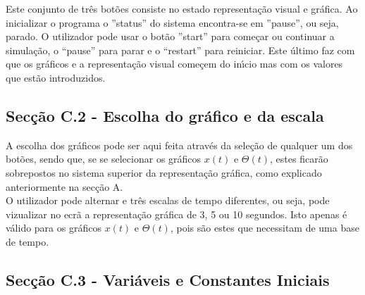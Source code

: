 \documentclass[12pt]{article}
\begin{document}
{
Este conjunto de tr\^es bot\~oes consiste no estado representa\c{c}\~ao visual e gr\'afica. Ao inicializar o programa o ''status'' do sistema encontra-se em ''pause'', ou seja, parado. O utilizador pode usar o bot\~ao ''start'' para come\c{c}ar ou continuar a simula\c{c}\~ao, o “pause” para parar e o “restart” para reiniciar. Este \'ultimo faz com que os gr\'aficos e a representa\c{c}\~ao visual come\c{c}em do in\'{\i}cio mas com os valores que est\~ao introduzidos. 
}

\subsection{Sec\c{c}\~ao C.2 - Escolha do gr\'afico e da escala}

{
A escolha dos gr\'aficos pode ser aqui feita atrav\'es da sele\c{c}\~ao de qualquer um dos bot\~oes, sendo que, se se selecionar os gr\'aficos $x(t)$ e $\Theta(t)$, estes ficar\~ao sobrepostos no sistema superior da representa\c{c}\~ao gr\'afica, como explicado anteriormente na sec\c{c}\~ao A.
\\
O utilizador pode alternar e tr\^es escalas de tempo diferentes, ou seja, pode vizualizar no ecr\~a a representa\c{c}\~ao gr\'afica de 3, 5 ou 10 segundos. Isto apenas \'e v\'alido para os gr\'aficos $x(t)$ e $\Theta(t)$, pois s\~ao estes que necessitam de uma base de tempo.
}

\subsection{Sec\c{c}\~ao C.3 - Vari\'aveis e Constantes Iniciais}
\end{document}
